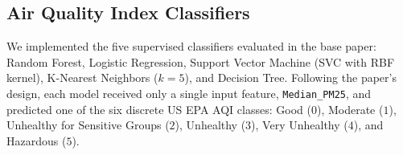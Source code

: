 \subsection{Air Quality Index Classifiers}
We implemented the five supervised classifiers evaluated in the base paper: Random Forest, Logistic Regression, Support Vector Machine (SVC with RBF kernel), K-Nearest Neighbors ($k = 5$), and Decision Tree. Following the paper's design, each model received only a single input feature, \texttt{Median\_PM25}, and predicted one of the six discrete US EPA AQI classes: Good ($0$), Moderate ($1$), Unhealthy for Sensitive Groups ($2$), Unhealthy ($3$), Very Unhealthy ($4$), and Hazardous ($5$).
